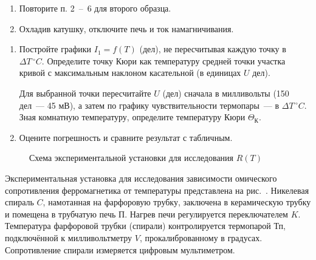 \begin{lab:task}
\begin{enumerate}
\item
  Повторите п. 2~--~6 для второго образца.
\item
  Охладив катушку, отключите печь и ток намагничивания.
\end{enumerate}
\begin{enumerate}

\item
  Постройте графики $I_1 = f(T)$ (дел), не пересчитывая каждую точку в $\Delta
T\,^{\circ} C$. Определите точку Кюри как температуру средней точки участка
кривой с максимальным наклоном касательной (в единицах $U$ дел).

Для выбранной точки пересчитайте $U$ (дел) сначала в милливольты (150 дел~---
45 мВ), а затем по графику чувствительности термопары~--- в  $\Delta
T\,^{\circ} C$. Зная комнатную температуру, определите температуру Кюри
$\Theta_{К}$.


\item
  Оцените погрешность и сравните результат с табличным.
\end{enumerate}

\end{lab:task}


\experiment

\begin{figure}[h!]
	\caption{Схема экспериментальной установки для исследования $R(T)$}
\end{figure}
Экспериментальная установка для исследования зависимости омического
сопротивления ферромагнетика от температуры представлена на
рис.~. Никелевая спираль $C$,
намотанная на фарфоровую трубку, заключена в керамическую трубку и помещена в
трубчатую печь $\text{П}$. Нагрев печи регулируется переключателем $K$.
Температура фарфоровой трубки (спирали) контролируется термопарой $\text{Тп}$,
подключённой к милливольтметру $V$, прокалиброванному в градусах. Сопротивление
спирали измеряется цифровым мультиметром.


